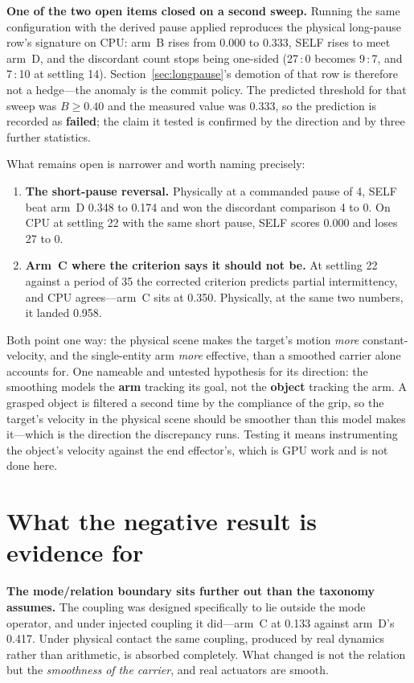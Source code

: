 \documentclass[10pt]{article}
\begin{document}
\textbf{One of the two open items closed on a second sweep.} Running the same
configuration with the derived pause applied reproduces the physical long-pause
row's signature on CPU: arm~B rises from 0.000 to 0.333, SELF rises to meet
arm~D, and the discordant count stops being one-sided (27\,:\,0 becomes 9\,:\,7,
and 7\,:\,10 at settling 14). Section~\ref{sec:longpause}'s demotion of that row
is therefore not a hedge---the anomaly is the commit policy. The predicted
threshold for that sweep was \(B \geq 0.40\) and the measured value was 0.333, so
the prediction is recorded as \textbf{failed}; the claim it tested is confirmed
by the direction and by three further statistics.

What remains open is narrower and worth naming precisely:

\begin{enumerate}[leftmargin=*]
\item \textbf{The short-pause reversal.} Physically at a commanded pause of 4,
SELF beat arm~D 0.348 to 0.174 and won the discordant comparison 4 to 0. On CPU
at settling 22 with the same short pause, SELF scores 0.000 and loses 27 to 0.
\item \textbf{Arm~C where the criterion says it should not be.} At settling 22
against a period of 35 the corrected criterion predicts partial intermittency,
and CPU agrees---arm~C sits at 0.350. Physically, at the same two numbers, it
landed 0.958.
\end{enumerate}

Both point one way: the physical scene makes the target's motion \emph{more}
constant-velocity, and the single-entity arm \emph{more} effective, than a
smoothed carrier alone accounts for. One nameable and untested hypothesis for its
direction: the smoothing models the \textbf{arm} tracking its goal, not the
\textbf{object} tracking the arm. A grasped object is filtered a second time by
the compliance of the grip, so the target's velocity in the physical scene should
be smoother than this model makes it---which is the direction the discrepancy
runs. Testing it means instrumenting the object's velocity against the end
effector's, which is GPU work and is not done here.

\section{What the negative result is evidence for}

\textbf{The mode/relation boundary sits further out than the taxonomy assumes.}
The coupling was designed specifically to lie outside the mode operator, and
under injected coupling it did---arm~C at 0.133 against arm~D's 0.417. Under
physical contact the same coupling, produced by real dynamics rather than
arithmetic, is absorbed completely. What changed is not the relation but the
\emph{smoothness of the carrier}, and real actuators are smooth.
\end{document}
